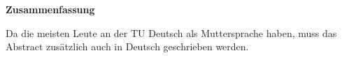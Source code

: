 \thispagestyle{empty}
\vspace*{1.4cm}

\begin{center}
    {\Large \textbf{Zusammenfassung}}
\end{center}

\vspace*{0.5cm}

\noindent 
Da die meisten Leute an der TU Deutsch als Muttersprache haben, muss das Abstract zus{\"a}tzlich auch in Deutsch geschrieben werden.